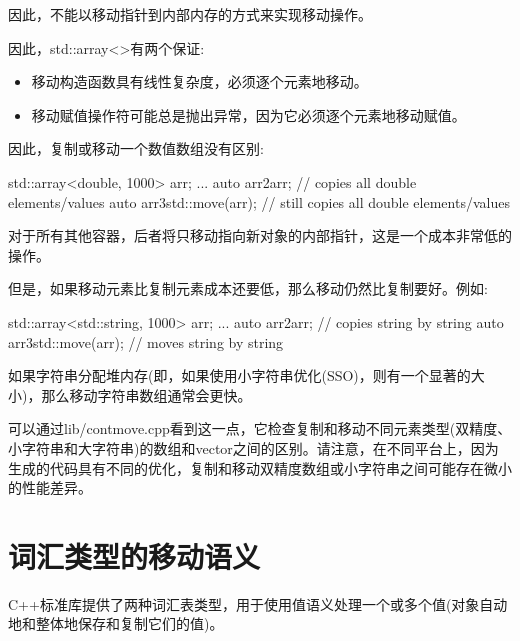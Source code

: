 因此，不能以移动指针到内部内存的方式来实现移动操作。\par

因此，std::\allowbreak{}array<\allowbreak{}>有两个保证:\par

\begin{itemize}
  \item 移动构造函数具有线性复杂度，必须逐个元素地移动。
  \item 移动赋值操作符可能总是抛出异常，因为它必须逐个元素地移动赋值。
\end{itemize}

因此，复制或移动一个数值数组没有区别:\par

\begin{codebox}[cpp]
std::array<double, 1000> arr;
...
auto arr2{arr}; // copies all double elements/values
auto arr3{std::move(arr)}; // still copies all double elements/values
\end{codebox}

对于所有其他容器，后者将只移动指向新对象的内部指针，这是一个成本非常低的操作。\par

但是，如果移动元素比复制元素成本还要低，那么移动仍然比复制要好。例如:\par

\begin{codebox}[cpp]
std::array<std::string, 1000> arr;
...
auto arr2{arr}; // copies string by string
auto arr3{std::move(arr)}; // moves string by string
\end{codebox}

如果字符串分配堆内存(即，如果使用小字符串优化(SSO)，则有一个显著的大小)，那么移动字符串数组通常会更快。\par

可以通过lib/contmove.cpp看到这一点，它检查复制和移动不同元素类型(双精度、小字符串和大字符串)的数组和vector之间的区别。请注意，在不同平台上，因为生成的代码具有不同的优化，复制和移动双精度数组或小字符串之间可能存在微小的性能差异。\par


\section{词汇类型的移动语义}

C++标准库提供了两种词汇表类型，用于使用值语义处理一个或多个值(对象自动地和整体地保存和复制它们的值)。\par


